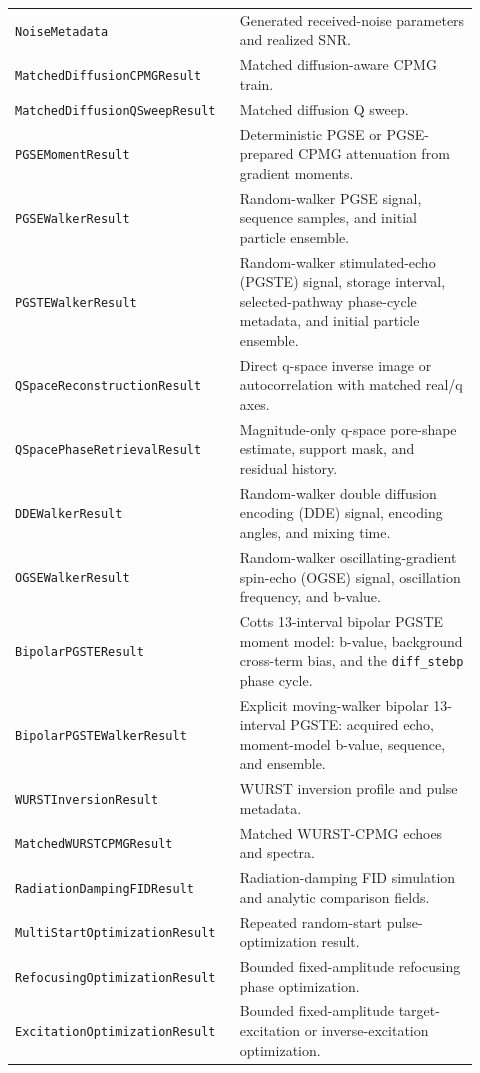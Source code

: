 \documentclass[11pt,oneside]{report}
\newcommand{\code}[1]{\texttt{#1}}
\begin{document}
\begin{longtable}{p{0.43\linewidth}p{0.49\linewidth}}
\code{NoiseMetadata} & Generated received-noise parameters and realized SNR. \\
\code{MatchedDiffusionCPMGResult} & Matched diffusion-aware CPMG train. \\
\code{MatchedDiffusionQSweepResult} & Matched diffusion Q sweep. \\
\code{PGSEMomentResult} & Deterministic PGSE or PGSE-prepared CPMG attenuation from gradient moments. \\
\code{PGSEWalkerResult} & Random-walker PGSE signal, sequence samples, and initial particle ensemble. \\
\code{PGSTEWalkerResult} & Random-walker stimulated-echo (PGSTE) signal, storage interval, selected-pathway phase-cycle metadata, and initial particle ensemble. \\
\code{QSpaceReconstructionResult} & Direct q-space inverse image or autocorrelation with matched real/q axes. \\
\code{QSpacePhaseRetrievalResult} & Magnitude-only q-space pore-shape estimate, support mask, and residual history. \\
\code{DDEWalkerResult} & Random-walker double diffusion encoding (DDE) signal, encoding angles, and mixing time. \\
\code{OGSEWalkerResult} & Random-walker oscillating-gradient spin-echo (OGSE) signal, oscillation frequency, and b-value. \\
\code{BipolarPGSTEResult} & Cotts 13-interval bipolar PGSTE moment model: b-value, background cross-term bias, and the \code{diff\_stebp} phase cycle. \\
\code{BipolarPGSTEWalkerResult} & Explicit moving-walker bipolar 13-interval PGSTE: acquired echo, moment-model b-value, sequence, and ensemble. \\
\code{WURSTInversionResult} & WURST inversion profile and pulse metadata. \\
\code{MatchedWURSTCPMGResult} & Matched WURST-CPMG echoes and spectra. \\
\code{RadiationDampingFIDResult} & Radiation-damping FID simulation and analytic comparison fields. \\
\code{MultiStartOptimizationResult} & Repeated random-start pulse-optimization result. \\
\code{RefocusingOptimizationResult} & Bounded fixed-amplitude refocusing phase optimization. \\
\code{ExcitationOptimizationResult} & Bounded fixed-amplitude target-excitation or inverse-excitation optimization. \\

\end{longtable}
\end{document}

